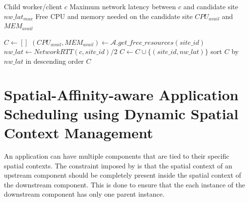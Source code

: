 \begin{algorithm}
\caption{$get\_candidate\_sites$}
\label{algo:get_candidate_sites}
\begin{algorithmic}[1]
\Require Child worker/client $c$
\Require Maximum network latency between $c$ and candidate site $nw\_lat_{max}$
\Require Free CPU and memory needed on the candidate site $CPU_{avail}$ and $MEM_{avail}$

\State $C \gets []$
    \State $\left( CPU_{avail}, MEM_{avail}\right) \gets \mathcal{A}.get\_free\_resources \left( site\_id \right)$
    \State $nw\_lat \gets NetworkRTT \left( c, site\_id\right)/2$
        \State $C \gets C \cup \{ \left( site\_id, nw\_lat \right) \}$
    \EndIf
\EndFor
\State sort $C$ by $nw\_lat$ in descending order
\State \Return $C$

\end{algorithmic}
\end{algorithm}

\section{Spatial-Affinity-aware Application Scheduling using Dynamic Spatial Context Management}
\label{sec:oneedge_spatial_ctx}
An application can have multiple components that are tied to their specific spatial contexts. The constraint imposed by \oneedge{} is that the spatial context of an upstream component should be completely present inside the spatial context of the downstream component. This is done to ensure that the each instance of the downstream component has only one parent instance. 

